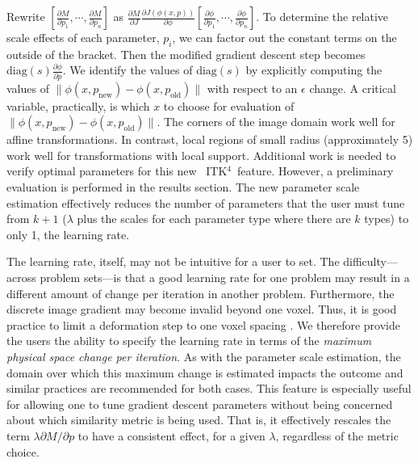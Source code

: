 \documentclass{llncs}
\newcommand{\tk}{~ITK$^{\text{4}}$~}
\begin{document}
Rewrite $[ \frac{\partial
  M}{\partial p_1} , \cdots , \frac{\partial
  M}{\partial p_n} 
 ]$ as $\frac{\partial M}{\partial J}\frac{\partial
  J(\phi(x,p))}{\partial \phi} [ \frac{\partial \phi}{\partial p_1} , \cdots , \frac{\partial \phi}{\partial p_n} ]$.
To determine the relative scale effects of each parameter, $p_i$, we
can factor out the constant terms on the outside of the bracket.  
Then the modified gradient descent step becomes
$\text{diag}(s)\frac{\partial \phi}{\partial p}$.  We identify the values
of $\text{diag}(s)$ by explicitly computing the values of $\| \phi(x,p_{\text{new}}) -
\phi(x,p_\text{old}) \| $ with respect to an $\epsilon$ change.  A critical variable,
practically, is which $x$ to choose for evaluation of $\| \phi(x,p_{\text{new}}) -
\phi(x,p_\text{old}) \| $.  The corners of the image domain work well
for affine transformations.  In contrast, local regions of small radius
(approximately 5) work well for transformations with local support.
Additional work is needed to verify optimal parameters for this new
\tk feature.  However, a preliminary evaluation is performed in the results
section.  The new parameter scale estimation effectively reduces the number of parameters
that the user must tune from $k+1$ ($\lambda$ plus the scales for each
parameter type where there are $k$ types) to only 1, the learning
rate.  

The learning rate, itself, may not be intuitive for a user to set.
The difficulty---across problem sets---is that a good learning rate for
one problem may result in a different amount of change per iteration
in another problem.  Furthermore, the discrete image gradient may
become invalid beyond one voxel.  Thus, it is good practice to limit a deformation step to one voxel spacing
\cite{Jenkinson2001}.  We therefore provide the users the ability to
specify the learning rate in terms of the {\em maximum physical space change
  per iteration}.  As with the parameter scale estimation, the domain
over which this maximum change is estimated impacts the outcome and
similar practices are recommended for both cases.   This feature is
especially useful for allowing one to tune gradient descent parameters
without being concerned about which similarity metric is being used.
That is, it effectively rescales the term $\lambda \partial M / \partial p$ to
have a consistent effect, for a given $\lambda$, regardless of the metric choice.
\end{document}
